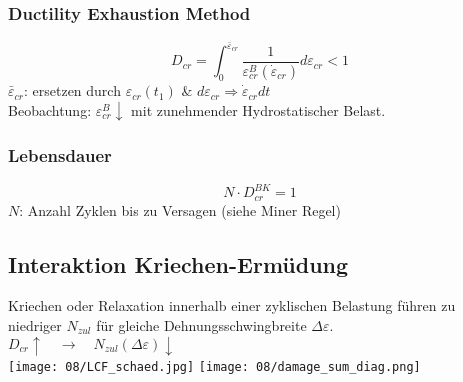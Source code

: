         \subsubsection{Ductility Exhaustion Method}
            \[D_{cr}=\int_0^{\bar{\varepsilon}_{cr}}\frac{1}{\varepsilon_{cr}^B(\dot{\varepsilon}_{cr})}d\varepsilon_{cr}< 1\]
            $\bar{\varepsilon}_{cr}$: ersetzen durch $\varepsilon_{cr}(t_1)$ \& $d\varepsilon_{cr} \Rightarrow \dot{\varepsilon}_{cr}dt$
            \\Beobachtung: $\varepsilon_{cr}^{B}\downarrow$ mit zunehmender Hydrostatischer Belast.
        \subsubsection{Lebensdauer}
            \[N\cdot D_{cr}^{BK} = 1\]
            $N$: Anzahl Zyklen bis zu Versagen (siehe Miner Regel)
    \subsection{Interaktion Kriechen-Ermüdung}
        Kriechen oder Relaxation innerhalb einer zyklischen Belastung führen zu niedriger $N_{zul}$ für gleiche Dehnungsschwingbreite $\Delta\varepsilon$.
        \\$D_{cr}\uparrow \quad\rightarrow\quad N_{zul}(\Delta\varepsilon)\downarrow$\\
            \texttt{[image: 08/LCF\_schaed.jpg]}
            \texttt{[image: 08/damage\_sum\_diag.png]}
        